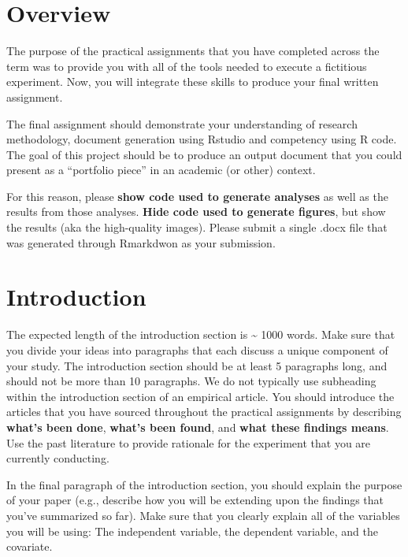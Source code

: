 \documentclass[
]{book}
\begin{document}
\section*{Overview}\label{overview-1}

The purpose of the practical assignments that you have completed across the term was to provide you with all of the tools needed to execute a fictitious experiment. Now, you will integrate these skills to produce your final written assignment.

The final assignment should demonstrate your understanding of research methodology, document generation using Rstudio and competency using R code. The goal of this project should be to produce an output document that you could present as a ``portfolio piece'' in an academic (or other) context.

For this reason, please \textbf{show code used to generate analyses} as well as the results from those analyses. \textbf{Hide code used to generate figures}, but show the results (aka the high-quality images). Please submit a single .docx file that was generated through Rmarkdwon as your submission.

\section*{Introduction}\label{introduction}

The expected length of the introduction section is \textasciitilde{} 1000 words. Make sure that you divide your ideas into paragraphs that each discuss a unique component of your study. The introduction section should be at least 5 paragraphs long, and should not be more than 10 paragraphs. We do not typically use subheading within the introduction section of an empirical article. You should introduce the articles that you have sourced throughout the practical assignments by describing \textbf{what's been done}, \textbf{what's been found}, and \textbf{what these findings means}. Use the past literature to provide rationale for the experiment that you are currently conducting.

In the final paragraph of the introduction section, you should explain the purpose of your paper (e.g., describe how you will be extending upon the findings that you've summarized so far). Make sure that you clearly explain all of the variables you will be using: The independent variable, the dependent variable, and the covariate.
\end{document}
